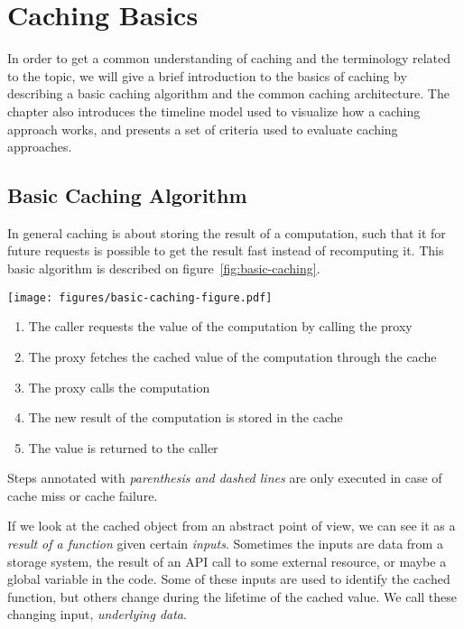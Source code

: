 \chapter{Caching Basics}
\label{chapter:caching-model}

In order to get a common understanding of caching and the terminology related to the topic, we will give a brief introduction to the basics of caching by describing a basic caching algorithm and the common caching architecture. The chapter also introduces the timeline model used to visualize how a caching approach works, and presents a set of criteria used to evaluate caching approaches.

\section{Basic Caching Algorithm}
\label{sec:caching_basics}

In general caching is about storing the result of a computation, such that it for future requests is possible to get the result fast instead of recomputing it. This basic algorithm is described on figure~\ref{fig:basic-caching}.

\begin{figure*}[ht!]
  \begin{center}
    \texttt{[image: figures/basic-caching-figure.pdf]}
  \end{center}
  \begin{enumerate}
    \item The caller requests the value of the computation by calling the proxy
    \item The proxy fetches the cached value of the computation through the cache
    \item[(3)] The proxy calls the computation
    \item[(4)] The new result of the computation is stored in the cache
    \item The value is returned to the caller
  \end{enumerate}
  \footnotesize{Steps annotated with \emph{parenthesis and dashed lines} are only executed in case of cache miss or cache failure.}
  \caption{The flow of basic caching}
  \label{fig:basic-caching}
\end{figure*}

If we look at the cached object from an abstract point of view, we can see it as a \emph{result of a function} given certain \emph{inputs}. Sometimes the inputs are data from a storage system, the result of an API call to some external resource, or maybe a global variable in the code. Some of these inputs are used to identify the cached function, but others change during the lifetime of the cached value. We call these changing input, \emph{underlying data}.

